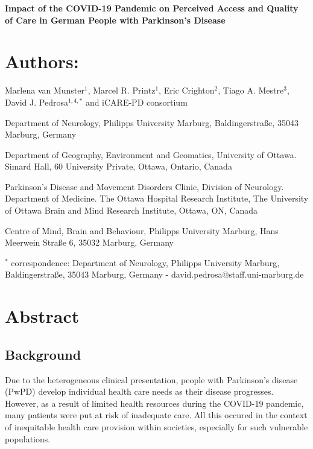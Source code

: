 \documentclass[a4paper,oneside,11pt,english]{scrartcl}
\begin{document}
\begin{titlepage}
\noindent\LARGE{\textbf{Impact of the \textsc{COVID}-19 Pandemic on Perceived Access and Quality of Care in German People with Parkinson's Disease}}
	
\section*{Authors:}
\large{Marlena van Munster$^{1}$, Marcel R. Printz$^{1}$, Eric Crighton$^{2}$, Tiago A. Mestre$^{3}$, David J. Pedrosa$^{1,4,*}$ and iCARE-PD consortium}\\
	
\begin{compactenum} 
\item \small{Department of Neurology, Philipps University Marburg, Baldingerstraße, 35043 Marburg, Germany}
\item \small{Department of Geography, Environment and Geomatics, University of Ottawa. Simard Hall, 60 University Private,  Ottawa, Ontario, Canada}
\item \small{Parkinson’s Disease and Movement Disorders Clinic, Division of Neurology. Department of Medicine. The Ottawa Hospital Research Institute, The University of Ottawa Brain and Mind Research Institute, Ottawa, ON, Canada}
\item \small{Centre of Mind, Brain and Behaviour, Philipps University Marburg, Hans Meerwein Straße 6, 35032 Marburg, Germany}\\
\end{compactenum}

\noindent\small{$^{*}$ correspondence: Department of Neurology, Philipps University Marburg, Baldingerstraße, 35043 Marburg, Germany - david.pedrosa@staff.uni-marburg.de}
\end{titlepage}


\section*{Abstract}
\subsection*{Background}
Due to the heterogeneous clinical presentation, people with Parkinson's disease (PwPD) develop individual health care needs as their disease progresses. However, as a result of limited health resources during the \textsc{COVID}-19 pandemic, many patients were put at risk of inadequate care. All this occured in the context of inequitable health care provision within societies, especially for such vulnerable populations.
\end{document}
